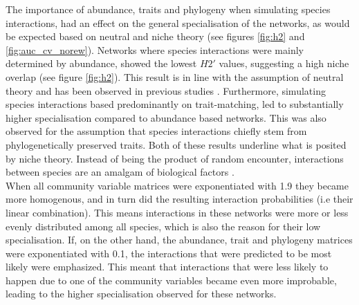 \documentclass[12pt,a4paper]{article}
\begin{document}
The importance of abundance, traits and phylogeny when simulating species interactions, had an effect on the general specialisation of the networks, as would be expected based on neutral and niche theory (see figures \ref{fig:h2} and \ref{fig:auc_cv_norew}). Networks where species interactions were mainly determined by abundance, showed the lowest $H2'$ values, suggesting a high niche overlap (see figure \ref{fig:h2}). This result is in line with the assumption of neutral theory and has been observed in previous studies \parencite{Vazquez2005, Vazquez2007}. Furthermore, simulating species interactions based predominantly on trait-matching, led to substantially higher specialisation compared to abundance based networks. This was also observed for the assumption that species interactions chiefly stem from phylogenetically preserved traits. Both of these results underline what is posited by niche theory. Instead of being the product of random encounter, interactions between species are an amalgam of biological factors \parencite{Jordano2003, Rezende2007, Vazquez2009, Olesen2011}.\\
 When all community variable matrices were exponentiated with 1.9 they became more homogenous, and in turn did the resulting interaction probabilities (i.e their linear combination). This means interactions in these networks were more or less evenly distributed among all species, which is also the reason for their low specialisation. If, on the other hand, the abundance, trait and phylogeny matrices were exponentiated with 0.1, the interactions that were predicted to be most likely were emphasized. This meant that interactions that were less likely to happen due to one of the community variables became even more improbable, leading to the higher specialisation observed for these networks. \paragraph{}
\end{document}
